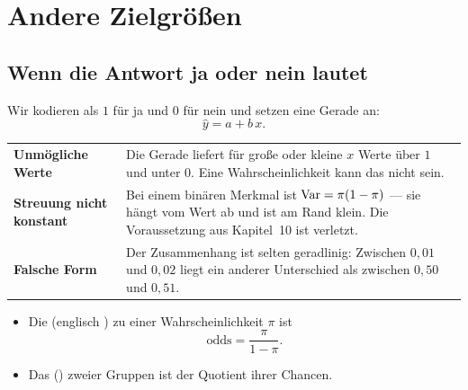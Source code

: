 \chapter{Andere Zielgrößen}

\section{Wenn die Antwort ja oder nein lautet}

\begin{warnung}
Wir kodieren  als $1$ für ja und $0$ für nein und setzen eine Gerade an:
\[ \hat y = a + b\,x . \]

\begin{center}
\renewcommand{\arraystretch}{1.52}
\begin{tabular}{@{}P{2.4cm}P{6.2cm}@{}}
\toprule
\textbf{Unmögliche Werte} & Die Gerade liefert für große oder kleine $x$ Werte über $1$ und unter $0$. Eine Wahrscheinlichkeit kann das nicht sein.\\
\textbf{Streuung nicht konstant} & Bei einem binären Merkmal ist $\operatorname{Var} = \pi(1-\pi)$ --- sie hängt vom Wert ab und ist am Rand klein. Die Voraussetzung aus Kapitel~10 ist verletzt.\\
\textbf{Falsche Form} & Der Zusammenhang ist selten geradlinig: Zwischen $0{,}01$ und $0{,}02$ liegt ein anderer Unterschied als zwischen $0{,}50$ und $0{,}51$.\\
\bottomrule
\end{tabular}
\end{center}
\end{warnung}

\begin{definition}
\begin{itemize}[leftmargin=1.4em, itemsep=4pt]
\item Die  (englisch ) zu einer Wahrscheinlichkeit $\pi$ ist
\[ \mathrm{odds} = \frac{\pi}{1-\pi} . \]
\item Das  () zweier Gruppen ist der Quotient ihrer Chancen.
\end{itemize}
\end{definition}

